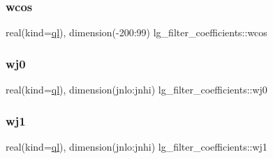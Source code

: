\subsubsection{\texorpdfstring{wcos}{wcos}}
{\footnotesize\ttfamily real(kind=\hyperlink{namespacelg__filter__coefficients_a6417faef3b543d16359fd03b39f7fcc5}{ql}), dimension(-\/200\+:99) lg\+\_\+filter\+\_\+coefficients\+::wcos}

\mbox{\label{namespacelg__filter__coefficients_a6118aefd8a6bfd0fedbf5530507da50f}} 
\subsubsection{\texorpdfstring{wj0}{wj0}}
{\footnotesize\ttfamily real(kind=\hyperlink{namespacelg__filter__coefficients_a6417faef3b543d16359fd03b39f7fcc5}{ql}), dimension(jnlo\+:jnhi) lg\+\_\+filter\+\_\+coefficients\+::wj0}

\mbox{\label{namespacelg__filter__coefficients_afbcfe820a24e8a0419832a766757189c}} 
\subsubsection{\texorpdfstring{wj1}{wj1}}
{\footnotesize\ttfamily real(kind=\hyperlink{namespacelg__filter__coefficients_a6417faef3b543d16359fd03b39f7fcc5}{ql}), dimension(jnlo\+:jnhi) lg\+\_\+filter\+\_\+coefficients\+::wj1}


